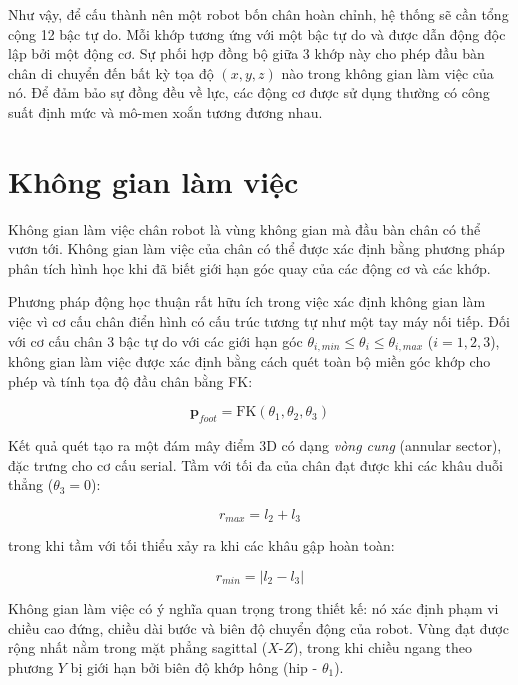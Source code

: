 Như vậy, để cấu thành nên một robot bốn chân hoàn chỉnh, hệ thống sẽ cần tổng cộng 12 bậc tự do. Mỗi khớp tương ứng với một bậc tự do và được dẫn động độc lập bởi một động cơ. Sự phối hợp đồng bộ giữa 3 khớp này cho phép đầu bàn chân di chuyển đến bất kỳ tọa độ $(x, y, z)$ nào trong không gian làm việc của nó. Để đảm bảo sự đồng đều về lực, các động cơ được sử dụng thường có công suất định mức và mô-men xoắn tương đương nhau.

\section{Không gian làm việc }
Không gian làm việc chân robot là vùng không gian mà đầu bàn chân có thể vươn tới. Không gian làm việc của chân có thể được xác định bằng phương pháp phân tích hình học khi đã biết giới hạn góc quay của các động cơ và các khớp.

Phương pháp động học thuận rất hữu ích trong việc xác định không gian làm việc vì cơ cấu chân điển hình có cấu trúc tương tự như một tay máy nối tiếp. Đối với cơ cấu chân 3 bậc tự do với các giới hạn góc $\theta_{i,min} \leq \theta_i \leq \theta_{i,max}$ ($i = 1, 2, 3$), không gian làm việc được xác định bằng cách quét toàn bộ miền góc khớp cho phép và tính tọa độ đầu chân bằng FK:

\begin{equation}
    \mathbf{p}_{foot} = \text{FK}(\theta_1, \theta_2, \theta_3)
\end{equation}

Kết quả quét tạo ra một đám mây điểm 3D có dạng \textit{vòng cung} (annular sector), đặc trưng cho cơ cấu serial. Tầm với tối đa của chân đạt được khi các khâu duỗi thẳng ($\theta_3 = 0$):

\begin{equation}
    r_{max} = l_2 + l_3
\end{equation}

trong khi tầm với tối thiểu xảy ra khi các khâu gập hoàn toàn:

\begin{equation}
    r_{min} = |l_2 - l_3|
\end{equation}

Không gian làm việc có ý nghĩa quan trọng trong thiết kế: nó xác định phạm vi chiều cao đứng, chiều dài bước và biên độ chuyển động của robot. Vùng đạt được rộng nhất nằm trong mặt phẳng sagittal ($X$-$Z$), trong khi chiều ngang theo phương $Y$ bị giới hạn bởi biên độ khớp hông (hip - $\theta_1$).



